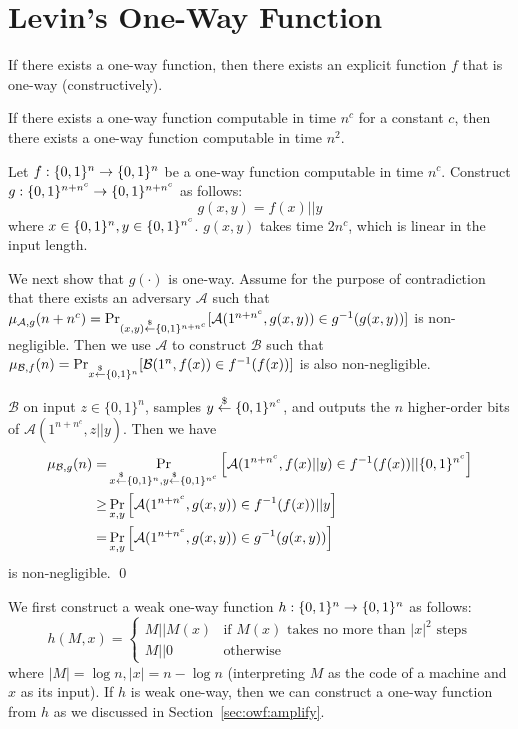 \section{Levin's One-Way Function}
\begin{tcolorbox}[colback=green!5!white]
\begin{theorem}\label{thm:levin}
If there exists a one-way function, then there exists an explicit function $f$ that is one-way  (constructively).
\end{theorem}
\end{tcolorbox}

\begin{lemma}\label{lem:n2owf}
If there exists a one-way function computable in time $n^c$ for a constant $c$, then there exists a one-way function computable in time $n^2$.
\end{lemma}
\proof
Let $f: \{ 0, 1 \}^{n} \rightarrow \{ 0, 1 \}^{n}$ be a one-way function computable in time $n^c$.
Construct $g: \{ 0, 1 \}^{n+n^c} \rightarrow \{ 0, 1 \}^{n+n^c}$ as follows:
$$g(x,y) = f(x) || y$$
where $x \in \{ 0, 1 \}^{n}, y \in \{ 0, 1 \}^{n^c}$.
$g(x,y)$ takes time $2n^c$, which is linear in the input length.

We next show that $g(\cdot)$ is one-way.
Assume for the purpose of contradiction that there exists an adversary $\mathcal{A}$ such that $\mu_{\mathcal{A},g}(n+n^c) = \Pr_{(x,y) \stackrel{\$}{\leftarrow} \{ 0, 1 \}^{n+n^c}}[ \mathcal{A}(1^{n+n^c}, g(x,y)) \in g^{-1}(g(x,y))]$ is non-negligible. Then we use $\mathcal{A}$ to construct $\mathcal{B}$ such that $\mu_{\mathcal{B},f}(n) = \Pr_{x \stackrel{\$}{\leftarrow} \{ 0, 1 \}^{n}}[ \mathcal{B}(1^n, f(x)) \in f^{-1}(f(x))]$ is also non-negligible.

$\mathcal{B}$ on input $z \in\{0,1\}^n$, samples $y \stackrel{\$}{\leftarrow} \{ 0, 1 \}^{n^c}$, and outputs the $n$ higher-order bits of  $\mathcal{A}(1^{n+n^c}, z||y)$. Then we have
\begin{align*}
\mu_{\mathcal{B},g}(n) =& \Pr_{x \stackrel{\$}{\leftarrow} \{ 0, 1 \}^{n}, y \stackrel{\$}{\leftarrow} \{ 0, 1 \}^{n^c}}\left[\mathcal{A}(1^{n+n^c}, f(x) || y) \in f^{-1}(f(x)) || \{ 0, 1 \}^{n^c}\right]\\
\geq&\Pr_{x,y}\left[\mathcal{A}(1^{n+n^c}, g(x,y)) \in f^{-1}(f(x)) || y\right]\\
=& \Pr_{x,y}\left[\mathcal{A}(1^{n+n^c}, g(x,y)) \in g^{-1}(g(x,y))\right]
\end{align*}
is non-negligible.
\qed

\bigskip
{}
We first construct a weak one-way function $h: \{ 0, 1 \}^{n} \rightarrow \{ 0, 1 \}^{n}$ as follows:
$$
h(M,x) = \left\{
\begin{array}{ll}
M || M(x) & \text{if $M(x)$ takes no more than $|x|^2$ steps} \\
M || 0 & \text{otherwise}
\end{array}
\right.
$$
where $|M| = \log n, |x| = n - \log n$ (interpreting $M$ as the code of a machine  and $x$ as its input).
If $h$ is weak one-way, then we can construct a one-way function from $h$ as we discussed in Section~\ref{sec:owf:amplify}.

